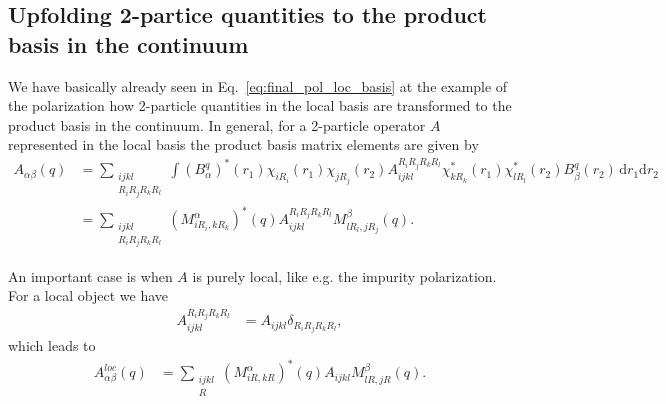 \documentclass[12pt,a4paper]{scrartcl}
\numberwithin{equation}{section}
\begin{document}
\subsection{Upfolding 2-partice quantities to the product basis in the continuum}
We have basically already seen in Eq.~\eqref{eq:final_pol_loc_basis}
at the example of the polarization how 2-particle quantities in the 
local basis are transformed to the product basis in the continuum.
In general, for a 2-particle operator $A$ represented in the local
basis the product basis matrix elements are given by
\begin{align}
 A_{\alpha\beta}(q)
 &= \sum_{\substack{ijkl\\R_iR_jR_kR_l}}\int (B^q_{\alpha})^*(r_1)
         \chi_{iR_i}(r_1)\chi_{jR_j}(r_2) 
         A^{R_iR_jR_kR_l}_{ijkl} \chi^*_{kR_k}(r_1)\chi^*_{lR_l}(r_2)
          B^q_{\beta}(r_2) \, \mathrm{d}r_1\mathrm{d}r_2 \\
%
&= \sum_{\substack{ijkl\\R_iR_jR_kR_l}}
        (M^{\alpha}_{iR_i,kR_k})^*(q)
         A^{R_iR_jR_kR_l}_{ijkl} M^{\beta}_{lR_l,jR_j}(q).
\end{align}

An important case is when $A$ is purely local, like e.g.
 the impurity polarization. For a local object we have
\begin{align}
 A^{R_iR_jR_kR_l}_{ijkl} 
 &= A_{ijkl} \delta_{R_iR_jR_kR_l}, 
\end{align}
which leads to
\begin{align}
 A^{loc}_{\alpha\beta}(q)
%
&= \sum_{\substack{ijkl\\R}}
        (M^{\alpha}_{iR,kR})^*(q)
         A_{ijkl} M^{\beta}_{lR,jR}(q).
\end{align}
\end{document}
